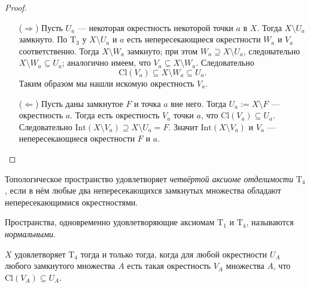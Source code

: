 \documentclass[12pt,a4paper]{article}
\newcommand{\Int}{\ensuremath{\mathrm{Int}}\xspace}
\newcommand{\Cl}{\ensuremath{\mathrm{Cl}}\xspace}
\newcommand{\T}{\ensuremath{\mathrm{T}}\xspace}
\begin{document}
    \begin{proof}
        \begin{itemize}
            \item[($\Rightarrow$)]
                Пусть $U_a$ --- некоторая окрестность некоторой точки $a$ в $X$. Тогда $X \setminus U_a$ замкнуто. По $\T_3$ у $X \setminus U_a$ и $a$ есть непересекающиеся окрестности $W_a$ и $V_a$ соответственно. Тогда $X \setminus W_a$ замкнуто; при этом $W_a \supseteq X \setminus U_a$, следовательно $X \setminus W_a \subseteq U_a$; аналогично имеем, что $V_a \subseteq X \setminus W_a$. Следовательно
                \[\Cl(V_a) \subseteq X \setminus W_a \subseteq U_a.\]
                Таким образом мы нашли искомую окрестность $V_a$.

            \item[($\Leftarrow$)]
                Пусть даны замкнутое $F$ и точка $a$ вне него. Тогда $U_a := X \setminus F$ --- окрестность $a$. Тогда есть окрестность $V_a$ точки $a$, что $\Cl(V_a) \subseteq U_a$. Следовательно $\Int(X \setminus V_a) \supseteq X \setminus U_a = F$. Значит $\Int(X \setminus V_a)$ и $V_a$ --- непересекающиеся окрестности $F$ и $a$.
        \end{itemize}
    \end{proof}

    \begin{definition}
        Топологическое пространство удовлетворяет \emph{четвёртой аксиоме отделимости} $\T_4$, если в нём любые два непересекающихся замкнутых множества обладают непересекающимися окрестностями.

        Пространства, одновременно удовлетворяющие аксиомам $\T_1$ и $\T_4$, называются \emph{нормальными}.
    \end{definition}

    \begin{theorem}
        $X$ удовлетворяет $\T_4$ тогда и только тогда, когда для любой окрестности $U_A$ любого замкнутого множества $A$ есть такая окрестность $V_A$ множества $A$, что $\Cl(V_A) \subseteq U_A$.
    \end{theorem}
\end{document}
